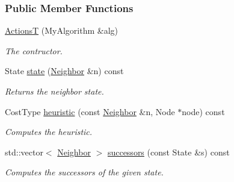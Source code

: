 \subsubsection*{Public Member Functions}
\begin{DoxyCompactItemize}
\item 
\hyperlink{structgenerator_1_1ActionsT_a5cce4e0a1ecf3ab4127e83af97cad8a5}{ActionsT} (My\+Algorithm \&alg)
\begin{DoxyCompactList}\small\item\em The contructor. \end{DoxyCompactList}\item 
State \hyperlink{structgenerator_1_1ActionsT_a5515a3dc42d2b1081c2d683054cf2d6a}{state} (\hyperlink{structgenerator_1_1ActionsT_a40dcae773c79aa663b32c939474bcf13}{Neighbor} \&n) const 
\begin{DoxyCompactList}\small\item\em Returns the neighbor state. \end{DoxyCompactList}\item 
Cost\+Type \hyperlink{structgenerator_1_1ActionsT_abff2d91a6ed45e98ac65eb1b6123bfd5}{heuristic} (const \hyperlink{structgenerator_1_1ActionsT_a40dcae773c79aa663b32c939474bcf13}{Neighbor} \&n, Node $\ast$node) const 
\begin{DoxyCompactList}\small\item\em Computes the heuristic. \end{DoxyCompactList}\item 
std\+::vector$<$ \hyperlink{structgenerator_1_1ActionsT_a40dcae773c79aa663b32c939474bcf13}{Neighbor} $>$ \hyperlink{structgenerator_1_1ActionsT_a9ae350b07ca2c4b95c819ac727454f14}{successors} (const State \&s) const 
\begin{DoxyCompactList}\small\item\em Computes the successors of the given state. \end{DoxyCompactList}\end{DoxyCompactItemize}
